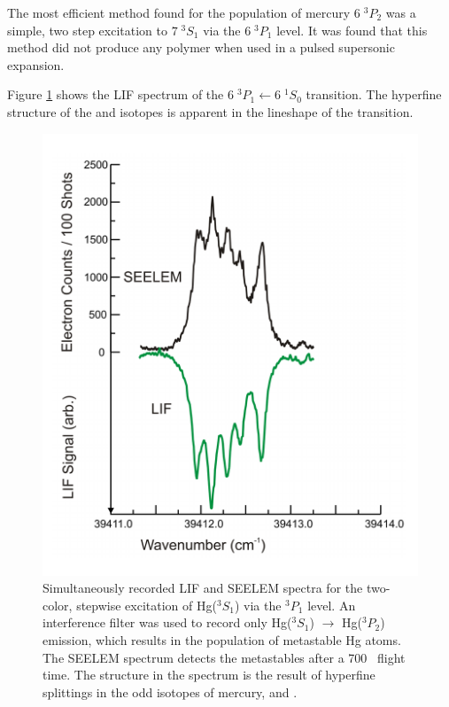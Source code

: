 \documentclass[12pt]{mitthesis}
\begin{document}
The most efficient method found for the population of mercury $6 \;
^3P_2$ was a simple, two step excitation to $7 \; ^3S_1$ via the $6 \;
^3P_1$ level.  It was found that this method did not produce any
polymer when used in a pulsed supersonic expansion.  

Figure \ref{fig:hg-twostep} shows the LIF spectrum of the $6 \; ^3P_1
\leftarrow 6\;^1S_0$ transition.  The hyperfine structure of the
 and  isotopes is apparent in the lineshape
of the transition.

\begin{figure}
  \caption{Simultaneously recorded LIF and SEELEM spectra for the
    two-color, stepwise excitation of Hg($^3S_1$) via the $^3P_1$
    level.  An interference filter was used to record only Hg($^3S_1$)
    $\rightarrow$ Hg($^3P_2$) emission, which results in the
    population of metastable Hg atoms.  The SEELEM spectrum detects
    the metastables after a 700 \microsec\ flight time.  The structure
    in the spectrum is the result of hyperfine splittings in the odd
    isotopes of mercury,  and .}
  \label{fig:hg-twostep}
  \centering
  \includegraphics[width=6.5in]{hg-twostep.pdf}
\end{figure}
\end{document}
